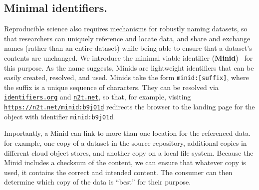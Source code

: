 \documentclass[11pt]{article}
\begin{document}
\subsection{Minimal identifiers.}

Reproducible science also requires mechanisms for robustly naming datasets, 
so that researchers can uniquely reference and locate data,
and share and exchange names (rather than an entire dataset) while being able to ensure that a dataset's contents are unchanged.
We introduce the minimal viable identifier (\textbf{Minid})~\cite{chard16} for this purpose. 
As the name suggests, Minids are lightweight identifiers
that can be easily created, resolved, and used. 
Minids 
take the form \texttt{minid:[suffix]}, 
where 
the suffix is a unique sequence of characters.
%
They can be resolved via \texttt{\href{https://identifiers.org}{identifiers.org}} and \texttt{\href{https://n2t.net}{n2t.net}},
so that, for example, visiting
\texttt{\href{https://n2t.net/minid:b9j01d}{https://n2t.net/minid:b9j01d}} 
redirects the browser to the landing page for the
object with identifier \texttt{minid:b9j01d}.

Importantly, a Minid can link to more than one location for the referenced data.
for example, one copy of a dataset in the source repository, 
additional copies in different cloud object stores, and another copy on a local file system.
Because the Minid includes a checksum of the content, 
we can ensure that whatever copy is used, it contains the correct and intended content.
The consumer can then determine which copy of the data is ``best'' for their purpose.
\end{document}
